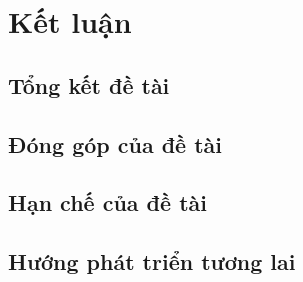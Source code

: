 \section{Kết luận}

\subsection{Tổng kết đề tài}

\subsection{Đóng góp của đề tài}

\subsection{Hạn chế của đề tài}

\subsection{Hướng phát triển tương lai}

